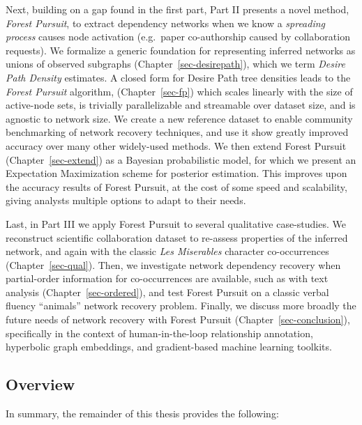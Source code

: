 \documentclass[%
	12pt,
		oneside,
		letterpaper
]{book}
\begin{document}
Next, building on a gap found in the first part, Part II presents a
novel method, \emph{Forest Pursuit}, to extract dependency networks when
we know a \emph{spreading process} causes node activation (e.g.~paper
co-authorship caused by collaboration requests). We formalize a generic
foundation for representing inferred networks as unions of observed
subgraphs (Chapter~\ref{sec-desirepath}), which we term \emph{Desire
Path Density} estimates. A closed form for Desire Path tree densities
leads to the \emph{Forest Pursuit} algorithm, (Chapter~\ref{sec-fp})
which scales linearly with the size of active-node sets, is trivially
parallelizable and streamable over dataset size, and is agnostic to
network size. We create a new reference dataset to enable community
benchmarking of network recovery techniques, and use it show greatly
improved accuracy over many other widely-used methods. We then extend
Forest Pursuit (Chapter~\ref{sec-extend}) as a Bayesian probabilistic
model, for which we present an Expectation Maximization scheme for
posterior estimation. This improves upon the accuracy results of Forest
Pursuit, at the cost of some speed and scalability, giving analysts
multiple options to adapt to their needs.

Last, in Part III we apply Forest Pursuit to several qualitative
case-studies. We reconstruct scientific collaboration dataset to
re-assess properties of the inferred network, and again with the classic
\emph{Les Miserables} character co-occurrences (Chapter~\ref{sec-qual}).
Then, we investigate network dependency recovery when partial-order
information for co-occurrences are available, such as with text analysis
(Chapter~\ref{sec-ordered}), and test Forest Pursuit on a classic verbal
fluency ``animals'' network recovery problem. Finally, we discuss more
broadly the future needs of network recovery with Forest Pursuit
(Chapter~\ref{sec-conclusion}), specifically in the context of
human-in-the-loop relationship annotation, hyperbolic graph embeddings,
and gradient-based machine learning toolkits.

\subsection{Overview}\label{overview}

In summary, the remainder of this thesis provides the following:
\end{document}
